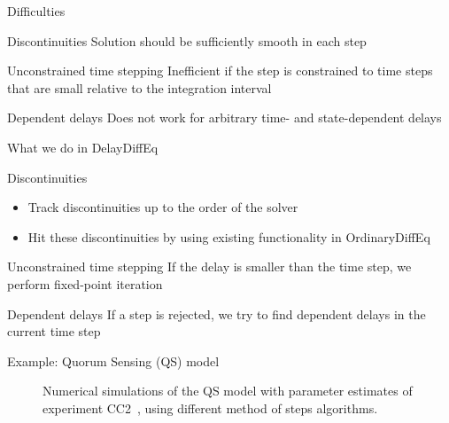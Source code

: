 \documentclass[aspectratio=169]{beamer}
\begin{document}
\begin{frame}{Difficulties}

  \begin{block}{Discontinuities}
    Solution should be sufficiently smooth in each step \parencite[see][]{Bellen_2003}
  \end{block}

  \pause

  \begin{block}{Unconstrained time stepping}
    Inefficient if the step is constrained to time steps that are small relative to the integration interval
  \end{block}

  \pause

  \begin{block}{Dependent delays}
    Does not work for arbitrary time- and state-dependent delays
  \end{block}
\end{frame}

\begin{frame}{What we do in DelayDiffEq}
  \begin{block}{Discontinuities}
    \begin{itemize}
    \item Track discontinuities up to the order of the solver
    \item Hit these discontinuities by using existing functionality in OrdinaryDiffEq
    \end{itemize}
  \end{block}

  \pause

  \begin{block}{Unconstrained time stepping}
    If the delay is smaller than the time step, we perform fixed-point iteration
  \end{block}

  \pause

  \begin{block}{Dependent delays}
    If a step is rejected, we try to find dependent delays in the current time step
  \end{block}
\end{frame}

\begin{frame}{Example: Quorum Sensing (QS) model}
  \vspace*{-1.5ex}
  \begin{figure}[hbp]
    \begin{center}
      
      \vspace*{-1.5ex}
      \caption{\label{fig:qs_comparison}Numerical simulations of the QS model with parameter estimates of experiment CC2~\parencite{buddrus-schiemann14_analy_n_acylh_lacton_dynam}, using different method of steps algorithms.}
    \end{center}
  \end{figure}
\end{frame}
\end{document}

